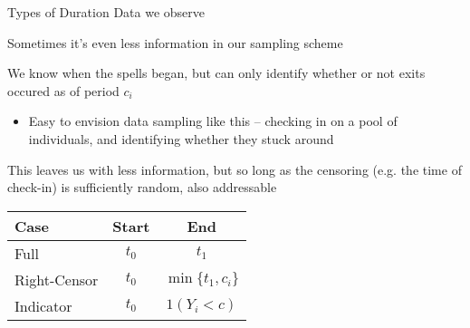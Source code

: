 \documentclass[notes,11pt, aspectratio=169]{beamer}
\newenvironment{wideitemize}{\itemize\addtolength{\itemsep}{10pt}}{\enditemize}
\begin{document}
\begin{frame}{Types of Duration Data we observe}
  \begin{wideitemize}
  \item Sometimes it's even less information in our sampling scheme
  \item We know when the spells began, but can only identify whether
    or not exits occured as of period $c_{i}$
    \begin{itemize}
    \item Easy to envision data sampling like this -- checking in on a
      pool of individuals, and identifying whether they stuck around
    \end{itemize}
  \item This leaves us with less information, but so
    long as the censoring (e.g. the time of check-in) is sufficiently
    random, also addressable
  \end{wideitemize}
  \begin{center}
    \begin{tabular}{lcc}
      Case & Start & End\\
      \midrule
      Full & $t_{0}$ & $t_{1}$\\
      Right-Censor & $t_{0}$ & $\min\{{t_{1}, c_{i}}\}$\\
      Indicator   & $t_{0}$ & $1(Y_{i} < c)$\\            
    \end{tabular}
\end{center}
\end{frame}
\end{document}
